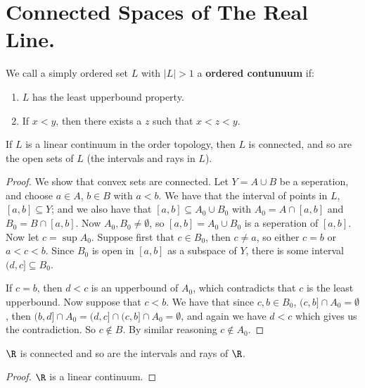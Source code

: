 
\section{Connected Spaces of The Real Line.}

\begin{definition}
    We call a simply ordered set $L$ with  $|L|>1$ a  \textbf{ordered contunuum} if:
        \begin{enumerate}[label=(\arabic*)]
            \item $L$ has the least upperbound property.

            \item If $x<y$, then there exists a  $z$ such that  $x<z<y$.
        \end{enumerate}
\end{definition}

\begin{theorem}\label{3.2.1}
    If $L$ is a linear continuum in the order topology, then  $L$ is connected, and so are the open
    sets of  $L$  (the intervals and rays in $L$).
\end{theorem}
\begin{proof}
    We show that convex sets are connected. Let $Y=A \cup B$ be a seperation, and choose  $a \in A$,
     $b \in B$ with  $a<b$. We have that the interval of points in  $L$,  $[a,b] \subseteq Y$; and
     we also have that $[a,b] \subseteq A_0 \cup B_0$ with $ A_0=A \cap [a,b]$ and $ B_0=B \cap
     [a,b]$. Now $ A_0,B_0 \neq \emptyset$, so $[a,b]=A_0 \cup B_0$ is a seperation of $[a,b]$. Now
     let $c=\sup{A_0}$. Suppose first that $c \in B_0$, then $c \neq a$, so either $c=b$ or  $a<c<b$.
     Since  $ B_0$ is open in $[a,b]$ as a subspace of $Y$, there is some interval  $(d,c] \subseteq
     B_0$.

     If $c=b$, then  $d<c$ is an upperbound of  $ A_0$, which contradicts that $c$ is the least
     upperbound. Now suppose that $c<b$. We have that since  $c,b \in B_0$, $(c,b] \cap A_0=
     \emptyset$, then $(b,d] \cap A_0=(d,c] \cap (c,b] \cap A_0 = \emptyset$, and again we have
     $d<c$ which gives us the contradiction. So  $c \notin B$. By similar reasoning  $c \notin A_0$.
\end{proof}
\begin{corollary}
    $\R$ is connected and so are the intervals and rays of  $\R$.
\end{corollary}
\begin{proof}
    $\R$ is a linear continuum.
\end{proof}

